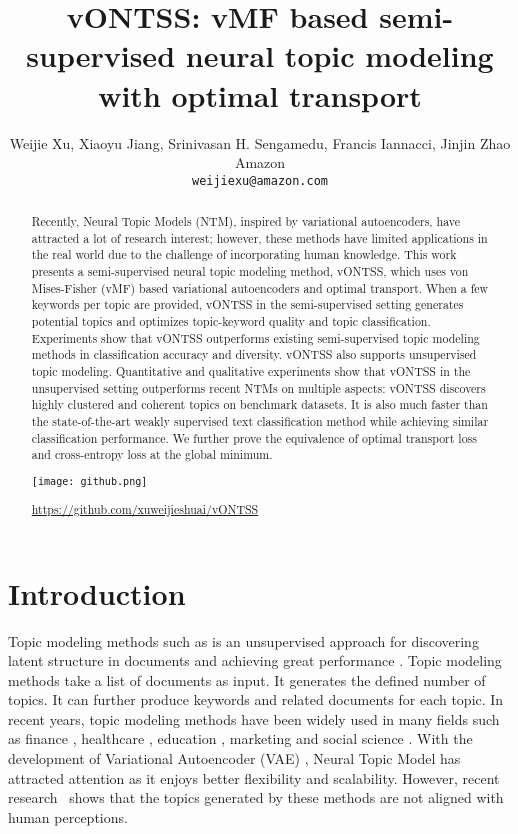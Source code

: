 \documentclass[11pt]{article}
\title{vONTSS: vMF based semi-supervised neural topic 
modeling\\ with optimal transport}
\author{Weijie Xu,  Xiaoyu Jiang, Srinivasan H. Sengamedu, Francis Iannacci, Jinjin Zhao \\
  Amazon \\
  \texttt{weijiexu@amazon.com} \\}
\begin{document}
\maketitle
\begin{abstract}



Recently, Neural Topic Models (NTM), inspired by variational autoencoders, have attracted a lot of research interest; however, these methods have limited applications in the real world due to the challenge of incorporating human knowledge. This work presents a semi-supervised neural topic modeling method, vONTSS, which uses von Mises-Fisher (vMF) based variational autoencoders and optimal transport. 
When a few keywords per topic are provided, vONTSS in the semi-supervised setting generates potential topics and optimizes topic-keyword quality and topic classification. Experiments show that vONTSS outperforms existing semi-supervised topic modeling methods in classification accuracy and diversity. vONTSS also supports unsupervised topic modeling. Quantitative and qualitative experiments show that vONTSS in the unsupervised setting outperforms recent NTMs on multiple aspects: vONTSS discovers highly clustered and coherent topics on benchmark datasets. It is also much faster than the state-of-the-art weakly supervised text classification method while achieving similar classification performance.
We further prove the equivalence of optimal transport loss and cross-entropy loss at the global minimum.

\vspace{0.5em}
\hspace{.5em}\texttt{[image: github.png]}\hspace{.75em}\parbox{\dimexpr\linewidth-2\fboxsep-2\fboxrule}{\url{https://github.com/xuweijieshuai/vONTSS}}
\vspace{-.5em}
\end{abstract}
\section{Introduction}


Topic modeling methods such as \cite{blei2003latent} is an unsupervised approach for discovering latent structure in documents and achieving great performance \cite{blei2009nested}. Topic modeling methods take a list of documents as input. It generates the defined number of topics. It can further produce keywords and related documents for each topic.
In recent years, topic modeling methods have been widely used in many fields such as finance \cite{https://doi.org/10.1111/eufm.12326}, healthcare \cite{DBLP:journals/corr/abs-1711-10960}, education \cite{zhao2020targeted}, marketing \cite{Reisenbichler2019} and social science \cite{762586}. With the development of Variational Autoencoder (VAE)  \cite{https://doi.org/10.48550/arxiv.1312.6114}, Neural Topic Model \cite{miao2018discovering,dieng2020topic} has attracted attention as it enjoys better flexibility and scalability. However, recent research~\cite{hoyle2021automated} shows that the topics generated by these methods are not aligned with human perceptions.
\end{document}
